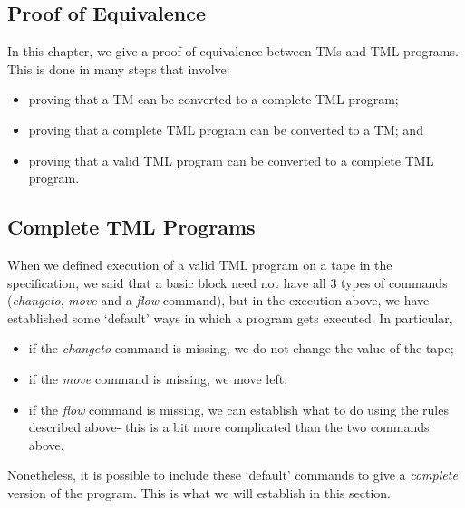 \begin{appendices}


\chapter{Proof of Equivalence}
In this chapter, we give a proof of equivalence between TMs and TML programs. This is done in many steps that involve:
\begin{itemize}
    \item proving that a TM can be converted to a complete TML program;
    \item proving that a complete TML program can be converted to a TM; and
    \item proving that a valid TML program can be converted to a complete TML program.
\end{itemize}

\section{Complete TML Programs}
When we defined execution of a valid TML program on a tape in the specification, we said that a basic block need not have all 3 types of commands (\textit{changeto}, \textit{move} and a \textit{flow} command), but in the execution above, we have established some `default' ways in which a program gets executed. In particular,
\begin{itemize}
    \item if the \textit{changeto} command is missing, we do not change the value of the tape;
    \item if the \textit{move} command is missing, we move left;
    \item if the \textit{flow} command is missing, we can establish what to do using the rules described above- this is a bit more complicated than the two commands above.
\end{itemize}
Nonetheless, it is possible to include these `default' commands to give a \emph{complete} version of the program. This is what we will establish in this section. 


\end{appendices}
